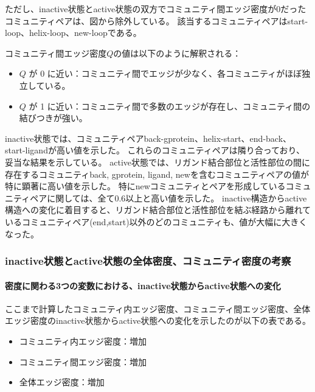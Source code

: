 ただし、inactive状態とactive状態の双方でコミュニティ間エッジ密度が0だったコミュニティペアは、図から除外している。
該当するコミュニティペアはstart-loop、helix-loop、new-loopである。

コミュニティ間エッジ密度$Q$の値は以下のように解釈される：
\begin{itemize}
    \item \( Q \) が 0 に近い：コミュニティ間でエッジが少なく、各コミュニティがほぼ独立している。
    \item \( Q \) が 1 に近い：コミュニティ間で多数のエッジが存在し、コミュニティ間の結びつきが強い。
\end{itemize}

inactive状態では、コミュニティペアback-gprotein、helix-start、end-back、start-ligandが高い値を示した。
これらのコミュニティペアは隣り合っており、妥当な結果を示している。
active状態では、リガンド結合部位と活性部位の間に存在するコミュニティback, gprotein, ligand, newを含むコミュニティペアの値が特に顕著に高い値を示した。
特にnewコミュニティとペアを形成しているコミュニティペアに関しては、全て0.6以上と高い値を示した。
inactive構造からactive構造への変化に着目すると、リガンド結合部位と活性部位を結ぶ経路から離れているコミュニティペア(end,start)以外のどのコミュニティも、値が大幅に大きくなった。

\subsubsection{inactive状態とactive状態の全体密度、コミュニティ密度の考察}


\paragraph{密度に関わる3つの変数における、inactive状態からactive状態への変化}

ここまで計算したコミュニティ内エッジ密度、コミュニティ間エッジ密度、全体エッジ密度のinactive状態からactive状態への変化を示したのが以下の表である。
\begin{itemize}
    \item コミュニティ内エッジ密度：増加
    \item コミュニティ間エッジ密度：増加
    \item 全体エッジ密度：増加
\end{itemize}

